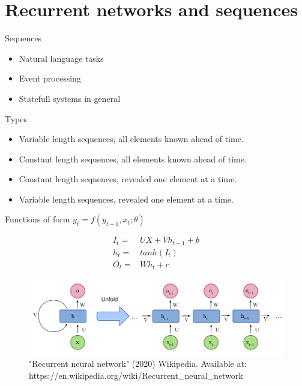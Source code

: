 \section{Recurrent networks and sequences}

\begin{frame}{Sequences} 
			\begin{itemize}
				\item Natural language tasks 
				\item Event processing  
				\item Statefull systems in general
			\end{itemize}	
		\begin{block}{Types}
			\begin{itemize}
				\item Variable length sequences, all elements known ahead of time. 
				\item Constant length sequences, all elements known ahead of time. 
				\item Constant length sequences, revealed one element at a time.
				\item Variable length sequences, revealed one element at a time.
			\end{itemize}
		\end{block}

\end{frame}

\begin{frame}{Functions of form $y_t = f(y_{t-1}, x_t; \theta)$}

\begin{eqnarray}
I_t =& UX+Vh_{t-1}+b \\
h_t =& tanh(I_t) \\
O_t =& Wh_t + c 
\end{eqnarray}

\begin{center}
\begin{figure}
	\includegraphics[width=.8\textwidth]{figures/rnn_wikipedia_1}
	\caption*{\tiny{"Recurrent neural network" (2020) Wikipedia. Available at:
	https://en.wikipedia.org/wiki/Recurrent\_neural\_network}}
\end{figure}
\end{center}
\end{frame}


